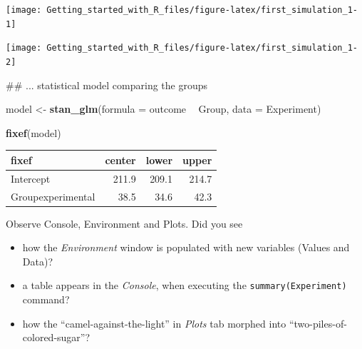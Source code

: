 \documentclass[]{svmono}
\newenvironment{Shaded}{\begin{snugshade}}{\end{snugshade}}
\newcommand{\KeywordTok}[1]{\textcolor[rgb]{0.13,0.29,0.53}{\textbf{#1}}}
\newcommand{\DataTypeTok}[1]{\textcolor[rgb]{0.13,0.29,0.53}{#1}}
\newcommand{\StringTok}[1]{\textcolor[rgb]{0.31,0.60,0.02}{#1}}
\newcommand{\OperatorTok}[1]{\textcolor[rgb]{0.81,0.36,0.00}{\textbf{#1}}}
\newcommand{\NormalTok}[1]{#1}
\providecommand{\tightlist}{%
  \setlength{\itemsep}{0pt}\setlength{\parskip}{0pt}}
\begin{document}
\texttt{[image: Getting\_started\_with\_R\_files/figure-latex/first\_simulation\_1-1]}

\begin{Shaded}
\end{Shaded}

\texttt{[image: Getting\_started\_with\_R\_files/figure-latex/first\_simulation\_1-2]}

\begin{Shaded}
\begin{Highlighting}[]
\NormalTok{## ... statistical model comparing the groups}

\NormalTok{model <-}\StringTok{ }\KeywordTok{stan_glm}\NormalTok{(}\DataTypeTok{formula =}\NormalTok{ outcome }\OperatorTok{~}\StringTok{ }\NormalTok{Group, }
            \DataTypeTok{data =}\NormalTok{ Experiment) }
\end{Highlighting}
\end{Shaded}

\begin{Shaded}
\begin{Highlighting}[]
\KeywordTok{fixef}\NormalTok{(model)}
\end{Highlighting}
\end{Shaded}

\begin{longtable}[]{@{}lrrr@{}}
\toprule
fixef & center & lower & upper\tabularnewline
\midrule
\endhead
Intercept & 211.9 & 209.1 & 214.7\tabularnewline
Groupexperimental & 38.5 & 34.6 & 42.3\tabularnewline
\bottomrule
\end{longtable}

Observe Console, Environment and Plots. Did you see

\begin{itemize}
\tightlist
\item
  how the \emph{Environment} window is populated with new variables
  (Values and Data)?
\item
  a table appears in the \emph{Console}, when executing the
  \texttt{summary(Experiment)} command?
\item
  how the ``camel-against-the-light'' in \emph{Plots} tab morphed into
  ``two-piles-of-colored-sugar''?
\end{itemize}
\end{document}

